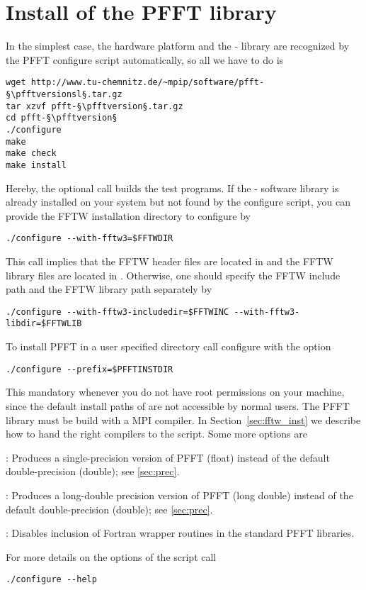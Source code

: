 \section{Install of the PFFT library}\label{sec:pfft-inst}
In the simplest case, the hardware platform and the \fftw-\fftwversion{} library are
recognized by the PFFT configure script automatically, so all we have to do is
\begin{lstlisting}[escapechar=§]
wget http://www.tu-chemnitz.de/~mpip/software/pfft-§\pfftversionsl§.tar.gz
tar xzvf pfft-§\pfftversion§.tar.gz
cd pfft-§\pfftversion§
./configure
make
make check
make install
\end{lstlisting}
Hereby, the optional call  builds the test programs.
If the \fftw-\fftwversion{} software library is already installed on your system but not found by the configure script,
you can provide the FFTW installation directory  to configure by
\begin{lstlisting}
./configure --with-fftw3=$FFTWDIR
\end{lstlisting}
This call implies that the FFTW header files are located in  and the FFTW library files are located
in . Otherwise, one should specify the FFTW include path  and the FFTW library path
 separately by
\begin{lstlisting}
./configure --with-fftw3-includedir=$FFTWINC --with-fftw3-libdir=$FFTWLIB
\end{lstlisting}
To install PFFT in a user specified directory  call configure with the option
\begin{lstlisting}
./configure --prefix=$PFFTINSTDIR
\end{lstlisting}
This mandatory whenever you do not have root permissions on your machine, since the default install paths of 
 are not accessible by normal users.
The PFFT library must be build with a MPI compiler. In Section~\ref{sec:fftw_inst} we describe how to hand the right compilers to the  script.
Some more options are
\begin{compactitem}
  \item {}: Produces a single-precision version of PFFT (float) instead of the default double-precision (double); see \ref{sec:prec}.
  \item {}: Produces a long-double precision version of PFFT (long double) instead of the default double-precision (double); see \ref{sec:prec}.
  \item {}: Disables inclusion of Fortran wrapper routines in the standard PFFT libraries.
\end{compactitem}
For more details on the options of the  script call
\begin{lstlisting}
./configure --help
\end{lstlisting}


